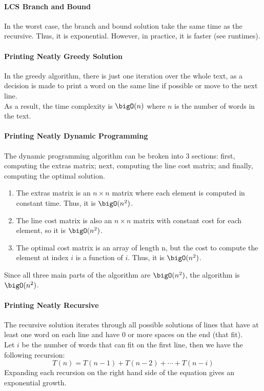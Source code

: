	\paragraph{LCS Branch and Bound}
		In the worst case, the branch and bound solution take the same time as the recursive. Thus, it is exponential. However, in practice, it is faster (see runtimes).

	\paragraph{Printing Neatly Greedy Solution}
		In the greedy algorithm, there is just one iteration over the whole text, as a decision is made to print a word on the same line if possible or move to the next line. \\
		As a result, the time complexity is $\bigO(n)$ where $n$ is the number of words in the text.

	\paragraph{Printing Neatly Dynamic Programming}
		The dynamic programming algorithm can be broken into 3 sections: first, computing the extras matrix; next, computing the line cost matrix; and finally, computing the optimal solution.
		\begin{enumerate}
			\item The extras matrix is an $n \times n$ matrix where each element is computed in constant time. Thus, it is $\bigO(n^2)$.
			\item The line cost matrix is also an $n \times n$ matrix with constant cost for each element, so it is $\bigO(n^2)$.
			\item The optimal cost matrix is an array of length n, but the cost to compute the element at index $i$ is a function of $i$. Thus, it is $\bigO(n^2)$.
		\end{enumerate}
		Since all three main parts of the algorithm are $\bigO(n^2)$, the algorithm is $\bigO(n^2)$.

	\paragraph{Printing Neatly Recursive}
		The recursive solution iterates through all possible solutions of lines that have at least one word on each line and have 0 or more spaces on the end (that fit). \\
		Let $i$ be the number of words that can fit on the first line, then we have the following recursion:
			$$T(n) = T(n-1) + T(n-2) + \cdots + T(n-i)$$
		Expanding each recursion on the right hand side of the equation gives an exponential growth.

